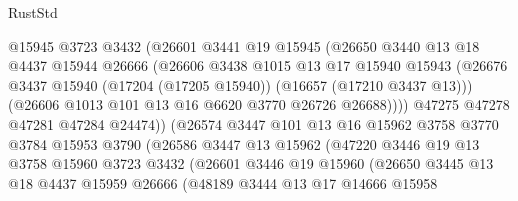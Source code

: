 \begin{lexlean}{RustStd}
\begin{coremodule}
                          @15945
                          @3723
                          @3432
                          (@26601
                            @3441
                            @19
                            @15945
                            (@26650
                              @3440
                              @13
                              @18
                              @4437
                              @15944
                              @26666
                              (@26606
                                @3438
                                @1015
                                @13
                                @17
                                @15940
                                @15943
                                (@26676
                                  @3437
                                  @15940
                                  (@17204 (@17205 @15940))
                                  (@16657 (@17210 @3437 @13)))
                                (@26606 @1013 @101 @13 @16 @6620 @3770 @26726 @26688))))
                          @47275
                          @47278
                          @47281
                          @47284
                          @24474))
                      (@26574
                        @3447
                        @101
                        @13
                        @16
                        @15962
                        @3758
                        @3770
                        @3784
                        @15953
                        @3790
                        (@26586
                          @3447
                          @13
                          @15962
                          (@47220
                            @3446
                            @19
                            @13
                            @3758
                            @15960
                            @3723
                            @3432
                            (@26601
                              @3446
                              @19
                              @15960
                              (@26650
                                @3445
                                @13
                                @18
                                @4437
                                @15959
                                @26666
                                (@48189
                                  @3444
                                  @13
                                  @17
                                  @14666
                                  @15958

\end{coremodule}
\end{lexlean}
